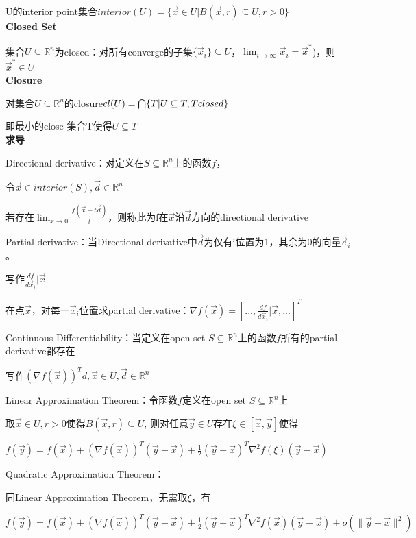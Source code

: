 \documentclass[UTF8]{ctexart}
\begin{document}
  U的interior point集合$interior(U) = \{\vec{x} \in U | B(\vec{x}, r) \subseteq U, r > 0\}$\\
\textbf{Closed Set}

  集合$U \subseteq \mathbb{R}^n $为closed：对所有converge的子集$\{\vec{x}_i\} \subseteq U$，$\lim_{i \to \infty} \vec{x}_i = \vec{x}^*$)，则$\vec{x}^* \in U$\\
\textbf{Closure}

  对集合$U \subseteq \mathbb{R}^n $的closure$cl(U) = \bigcap\{T | U \subseteq T, T \space closed\}$

  \quad 即最小的close 集合T使得$U \subseteq T$\\
\textbf{求导}

  Directional derivative：对定义在$S \subseteq \mathbb{R}^n$上的函数$f$，
  
  \quad 令$\vec{x} \in interior(S), \vec{d} \in \mathbb{R}^n$

  \quad 若存在$\lim_{x \to 0} \frac{f(\vec{x} + t\vec{d})}{t} $，则称此为f在$\vec{x}$沿$\vec{d}$方向的directional derivative
  
  Partial derivative：当Directional derivative中$\vec{d}$为仅有i位置为1，其余为0的向量$\vec{e}_i$。
  
  \quad 写作$\frac{df}{d\vec{x}_i}|\vec{x}$

  \quad 在点$\vec{x}$，对每一$\vec{x}_i$位置求partial derivative：$\nabla f(\vec{x}) = [..., \frac{df}{d\vec{x}_i}|\vec{x}, ...]^T$
  
  Continuous Differentiability：当定义在open set $S \subseteq \mathbb{R}^n$上的函数$f$所有的partial derivative都存在
  
  \quad 写作$(\nabla f(\vec{x}))^Td, \vec{x} \in U, \vec{d} \in \mathbb{R}^n$
  
  Linear Approximation Theorem：令函数$f$定义在open set $S \subseteq \mathbb{R}^n$上
  
  \quad 取$\vec{x} \in U, r > 0$使得$B(\vec{x}, r) \subseteq U$, 则对任意$\vec{y} \in U$存在$\xi \in [\vec{x}, \vec{y}]$使得
  
  \quad \quad $f(\vec{y}) = f(\vec{x}) + (\nabla f(\vec{x}))^T(\vec{y} - \vec{x}) + \frac{1}{2}(\vec{y} - \vec{x})^T\nabla^2 f(\xi) (\vec{y} - \vec{x})$
  
  Quadratic Approximation Theorem：
  
  \quad 同Linear Approximation Theorem，无需取$\xi$，有
  
  \quad \quad $f(\vec{y}) = f(\vec{x}) + (\nabla f(\vec{x}))^T(\vec{y} - \vec{x}) + \frac{1}{2}(\vec{y} - \vec{x})^T\nabla^2 f(\vec{x}) (\vec{y} - \vec{x}) + o(\|\vec{y} - \vec{x}\|^2)$
  
\end{document}

